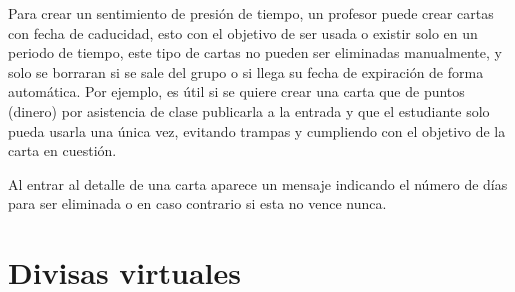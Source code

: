 Para crear un sentimiento de presión de tiempo, un profesor puede crear cartas con fecha de caducidad, esto 
con el objetivo de ser usada o existir solo en un periodo de tiempo, este tipo de cartas no pueden ser 
eliminadas manualmente, y solo se borraran si se sale del grupo o si llega su fecha de expiración de forma 
automática. Por ejemplo, es útil si se quiere crear una carta que de puntos (dinero) por asistencia de clase 
publicarla a la entrada y que el estudiante solo pueda usarla una única vez, evitando trampas y cumpliendo con 
el objetivo de la carta en cuestión.

Al entrar al detalle de una carta aparece un mensaje indicando el número de días para ser eliminada o en caso 
contrario si esta no vence nunca.

\section{Divisas virtuales}
\label{sec:app_enviardinero}

